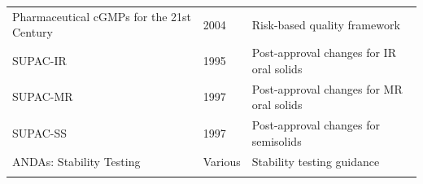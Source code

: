 \documentclass[
  11pt,
  a4paper,
]{report}
\begin{document}
\begin{longtable}[]{@{}lll@{}}
\begin{minipage}[t]{0.40\columnwidth}
Pharmaceutical cGMPs for the 21st Century\strut
\end{minipage} & \begin{minipage}[t]{0.24\columnwidth}\raggedright
2004\strut
\end{minipage} & \begin{minipage}[t]{0.28\columnwidth}\raggedright
Risk-based quality framework\strut
\end{minipage}\tabularnewline
\begin{minipage}[t]{0.40\columnwidth}\raggedright
SUPAC-IR\strut
\end{minipage} & \begin{minipage}[t]{0.24\columnwidth}\raggedright
1995\strut
\end{minipage} & \begin{minipage}[t]{0.28\columnwidth}\raggedright
Post-approval changes for IR oral solids\strut
\end{minipage}\tabularnewline
\begin{minipage}[t]{0.40\columnwidth}\raggedright
SUPAC-MR\strut
\end{minipage} & \begin{minipage}[t]{0.24\columnwidth}\raggedright
1997\strut
\end{minipage} & \begin{minipage}[t]{0.28\columnwidth}\raggedright
Post-approval changes for MR oral solids\strut
\end{minipage}\tabularnewline
\begin{minipage}[t]{0.40\columnwidth}\raggedright
SUPAC-SS\strut
\end{minipage} & \begin{minipage}[t]{0.24\columnwidth}\raggedright
1997\strut
\end{minipage} & \begin{minipage}[t]{0.28\columnwidth}\raggedright
Post-approval changes for semisolids\strut
\end{minipage}\tabularnewline
\begin{minipage}[t]{0.40\columnwidth}\raggedright
ANDAs: Stability Testing\strut
\end{minipage} & \begin{minipage}[t]{0.24\columnwidth}\raggedright
Various\strut
\end{minipage} & \begin{minipage}[t]{0.28\columnwidth}\raggedright
Stability testing guidance\strut
\end{minipage}\tabularnewline
\begin{minipage}[t]{0.40\columnwidth}\raggedright

\end{minipage}
\end{longtable}
\end{document}
